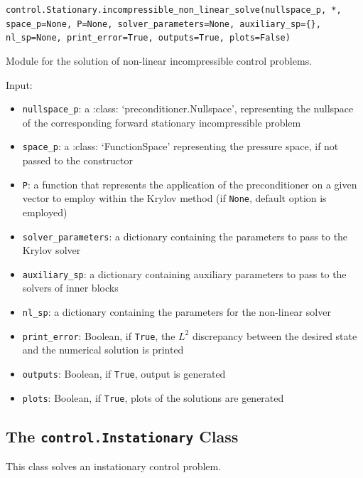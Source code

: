 \documentclass[letterpaper,10pt,english]{sphinxmanual}
\begin{document}
\vspace{3ex}

\texttt{control.Stationary.incompressible{\_}non{\_}linear{\_}solve(nullspace{\_}p, *, space{\_}p=None, P=None, solver{\_}parameters=None, auxiliary{\_}sp=\{\}, nl{\_}sp=None, print{\_}error=True, outputs=True, plots=False)}

Module for the solution of non-linear incompressible control problems.

Input:
\begin{itemize}
\item \texttt{nullspace{\_}p}: a :class: `preconditioner.Nullspace', representing
            the nullspace of the corresponding forward stationary
            incompressible problem

\item \texttt{space{\_}p}: a :class: `FunctionSpace' representing the pressure
            space, if not passed to the constructor

\item \texttt{P}: a function that represents the application of the
            preconditioner on a given vector to employ within the Krylov
            method (if \texttt{None}, default option is employed)

\item \texttt{solver{\_}parameters}: a dictionary containing the parameters to pass
            to the Krylov solver

\item \texttt{auxiliary{\_}sp}: a dictionary containing auxiliary parameters to
            pass to the solvers of inner blocks

\item \texttt{nl{\_}sp}: a dictionary containing the parameters for the non-linear
            solver

\item \texttt{print{\_}error}: Boolean, if \texttt{True}, the $L^2$ discrepancy between the desired state and the numerical solution is printed

\item \texttt{outputs}: Boolean, if \texttt{True}, output is generated

\item \texttt{plots}: Boolean, if \texttt{True}, plots of the solutions are generated
\end{itemize}



\subsection{The \texttt{control.Instationary} Class}
This class solves an instationary control problem.
\end{document}
